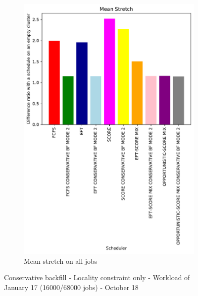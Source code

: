 \documentclass[a4paper]{article}
\begin{document}
\begin{figure}[H]
\begin{subfigure}[b]{0.4\linewidth}\centering\includegraphics[width=0.9\linewidth]{MBSS/plot/Results_FCFS_Score_Backfill_2022-01-17->2022-01-17_V9271_Mean_Stretch_450_128_32_256_4_1024.pdf}\caption{Mean stretch on all jobs}\end{subfigure}
\caption{Conservative backfill - Locality constraint only - Workload of January 17 (16000/68000 jobs) - October 18}\end{figure}
\end{document}
